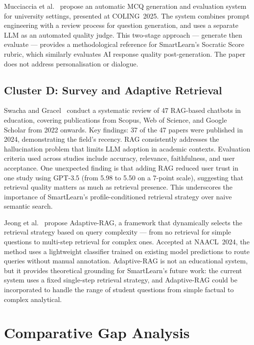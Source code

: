 \documentclass[12pt,a4paper]{report}
\begin{document}
Mucciaccia et al.~\cite{ref11} propose an automatic MCQ generation and evaluation system
for university settings, presented at COLING~2025. The system combines prompt
engineering with a review process for question generation, and uses a separate LLM as an
automated quality judge. This two-stage approach --- generate then evaluate --- provides
a methodological reference for SmartLearn's Socratic Score rubric, which similarly
evaluates AI response quality post-generation. The paper does not address
personalisation or dialogue.

\subsection{Cluster D: Survey and Adaptive Retrieval}

Swacha and Gracel~\cite{ref12} conduct a systematic review of 47 RAG-based chatbots in
education, covering publications from Scopus, Web of Science, and Google Scholar from
2022 onwards. Key findings: 37 of the 47 papers were published in 2024, demonstrating
the field's recency. RAG consistently addresses the hallucination problem that limits
LLM adoption in academic contexts. Evaluation criteria used across studies include
accuracy, relevance, faithfulness, and user acceptance. One unexpected finding is that
adding RAG reduced user trust in one study using GPT-3.5 (from 5.98 to 5.50 on a 7-point
scale), suggesting that retrieval quality matters as much as retrieval presence. This
underscores the importance of SmartLearn's profile-conditioned retrieval strategy over
naive semantic search.

Jeong et al.~\cite{ref13} propose Adaptive-RAG, a framework that dynamically selects the
retrieval strategy based on query complexity --- from no retrieval for simple questions
to multi-step retrieval for complex ones. Accepted at NAACL~2024, the method uses a
lightweight classifier trained on existing model predictions to route queries without
manual annotation. Adaptive-RAG is not an educational system, but it provides
theoretical grounding for SmartLearn's future work: the current system uses a fixed
single-step retrieval strategy, and Adaptive-RAG could be incorporated to handle the
range of student questions from simple factual to complex analytical.

\section{Comparative Gap Analysis}
\end{document}
